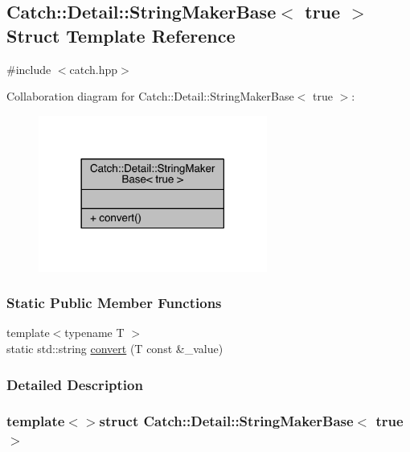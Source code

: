 \hypertarget{a00083}{}\subsection{Catch\+:\+:Detail\+:\+:String\+Maker\+Base$<$ true $>$ Struct Template Reference}
\label{a00083}


{\ttfamily \#include $<$catch.\+hpp$>$}



Collaboration diagram for Catch\+:\+:Detail\+:\+:String\+Maker\+Base$<$ true $>$\+:\nopagebreak
\begin{figure}[H]
\begin{center}
\leavevmode
\includegraphics[width=213pt]{a00307}
\end{center}
\end{figure}
\subsubsection*{Static Public Member Functions}
\begin{DoxyCompactItemize}
\item 
{\footnotesize template$<$typename T $>$ }\\static std\+::string \hyperlink{a00083_af9b5fdf7fddd8c5c873caa819e5f00f6}{convert} (T const \&\+\_\+value)
\end{DoxyCompactItemize}


\subsubsection{Detailed Description}
\subsubsection*{template$<$$>$struct Catch\+::\+Detail\+::\+String\+Maker\+Base$<$ true $>$}



